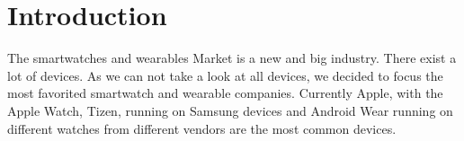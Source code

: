 \section{Introduction}

The smartwatches and wearables Market is a new and big industry. There exist a lot of devices.
As we can not take a look at all devices, we decided to focus the most favorited smartwatch and wearable companies. 
Currently Apple, with the Apple Watch, Tizen, running on Samsung devices and Android Wear running on different watches from different vendors are the most common devices.
